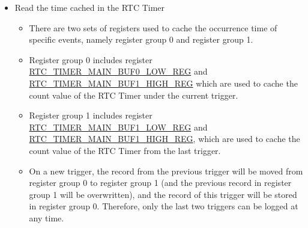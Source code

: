 \documentclass[main\_\_EN.tex]{subfiles}
\begin{document}
\begin{itemize}
\begin{itemize}
        \item Configure the target time through the registers below:

        \begin{longtable}[c]{|p{6cm}|p{9cm}|}
        \caption{Target Time Configuration} \label{tab:rtc-timer-target-time-configuration}
        \\\hline
        \textbf{Configuration Register} & \textbf{Description} \\
        \hline
         target time configuration. \\
        \hline
         the lower 32 bits of the target time.\\
        \hline
         the higher 16 bits of the target time.\\
        \hline
        \end{longtable}
    \end{itemize}


    \item Read the time cached in the RTC Timer
    \begin{itemize}
        \item There are two sets of registers used to cache the occurrence time of specific events, namely register group 0 and register group 1.
        \item Register group 0 includes register \hyperref[regdesc:RTCTIMERMAINBUF0LOWREG]{RTC\_TIMER\_MAIN\_BUF0\_LOW\_REG} and \hyperref[regdesc:RTCTIMERMAINBUF1HIGHREG]{RTC\_TIMER\_MAIN\_BUF1\_HIGH\_REG} which are used to cache the count value of the RTC Timer under the current trigger.
        \item Register group 1 includes register \hyperref[regdesc:RTCTIMERMAINBUF1LOWREG]{RTC\_TIMER\_MAIN\_BUF1\_LOW\_REG} and \hyperref[regdesc:RTCTIMERMAINBUF1HIGHREG]{RTC\_TIMER\_MAIN\_BUF1\_HIGH\_REG}, which are used to cache the count value of the RTC Timer from the last trigger.
        \item On a new trigger, the record from the previous trigger will be moved from register group 0 to register group 1 (and the previous record in register group 1 will be overwritten), and the record of this trigger will be stored in register group 0. Therefore, only the last two triggers can be logged at any time.


\end{itemize}
\end{itemize}
\end{document}
